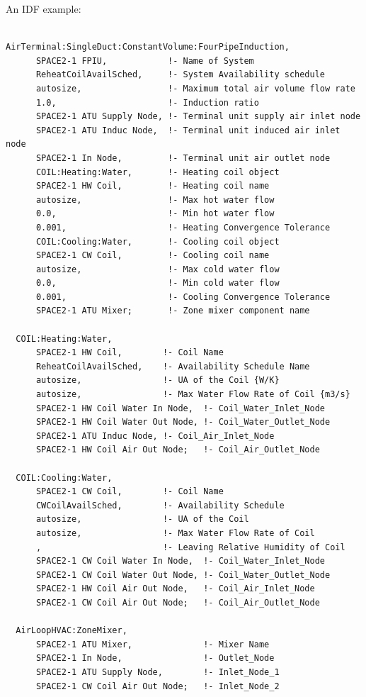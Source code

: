 An IDF example:

\begin{lstlisting}

AirTerminal:SingleDuct:ConstantVolume:FourPipeInduction,
      SPACE2-1 FPIU,            !- Name of System
      ReheatCoilAvailSched,     !- System Availability schedule
      autosize,                 !- Maximum total air volume flow rate
      1.0,                      !- Induction ratio
      SPACE2-1 ATU Supply Node, !- Terminal unit supply air inlet node
      SPACE2-1 ATU Induc Node,  !- Terminal unit induced air inlet node
      SPACE2-1 In Node,         !- Terminal unit air outlet node
      COIL:Heating:Water,       !- Heating coil object
      SPACE2-1 HW Coil,         !- Heating coil name
      autosize,                 !- Max hot water flow
      0.0,                      !- Min hot water flow
      0.001,                    !- Heating Convergence Tolerance
      COIL:Cooling:Water,       !- Cooling coil object
      SPACE2-1 CW Coil,         !- Cooling coil name
      autosize,                 !- Max cold water flow
      0.0,                      !- Min cold water flow
      0.001,                    !- Cooling Convergence Tolerance
      SPACE2-1 ATU Mixer;       !- Zone mixer component name

  COIL:Heating:Water,
      SPACE2-1 HW Coil,        !- Coil Name
      ReheatCoilAvailSched,    !- Availability Schedule Name
      autosize,                !- UA of the Coil {W/K}
      autosize,                !- Max Water Flow Rate of Coil {m3/s}
      SPACE2-1 HW Coil Water In Node,  !- Coil_Water_Inlet_Node
      SPACE2-1 HW Coil Water Out Node, !- Coil_Water_Outlet_Node
      SPACE2-1 ATU Induc Node, !- Coil_Air_Inlet_Node
      SPACE2-1 HW Coil Air Out Node;   !- Coil_Air_Outlet_Node

  COIL:Cooling:Water,
      SPACE2-1 CW Coil,        !- Coil Name
      CWCoilAvailSched,        !- Availability Schedule
      autosize,                !- UA of the Coil
      autosize,                !- Max Water Flow Rate of Coil
      ,                        !- Leaving Relative Humidity of Coil
      SPACE2-1 CW Coil Water In Node,  !- Coil_Water_Inlet_Node
      SPACE2-1 CW Coil Water Out Node, !- Coil_Water_Outlet_Node
      SPACE2-1 HW Coil Air Out Node,   !- Coil_Air_Inlet_Node
      SPACE2-1 CW Coil Air Out Node;   !- Coil_Air_Outlet_Node

  AirLoopHVAC:ZoneMixer,
      SPACE2-1 ATU Mixer,              !- Mixer Name
      SPACE2-1 In Node,                !- Outlet_Node
      SPACE2-1 ATU Supply Node,        !- Inlet_Node_1
      SPACE2-1 CW Coil Air Out Node;   !- Inlet_Node_2
\end{lstlisting}

